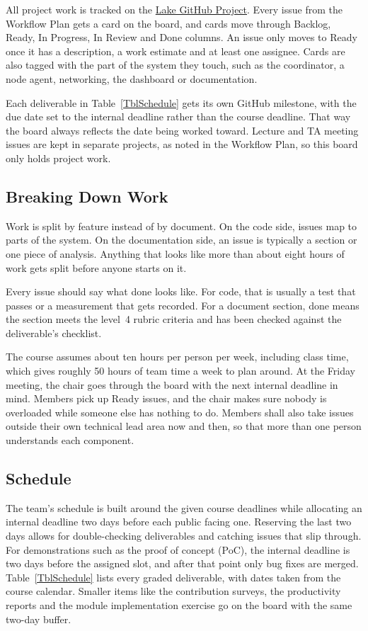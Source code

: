 \documentclass{article}
\begin{document}
All project work is tracked on the
\href{https://github.com/orgs/capstoneCEGJM/projects/1}{Lake GitHub Project}.
Every issue from the Workflow Plan gets a card on the board, and cards move
through Backlog, Ready, In Progress, In Review and Done columns. An issue only
moves to Ready once it has a description, a work estimate and at least
one assignee. Cards are also tagged with the part of the system they touch,
such as the coordinator, a node agent, networking, the dashboard or
documentation.

Each deliverable in Table~\ref{TblSchedule} gets its own GitHub milestone,
with the due date set to the internal deadline rather than the course
deadline. That way the board always reflects the date being worked
toward. Lecture and TA meeting issues are kept in separate projects, as noted
in the Workflow Plan, so this board only holds project work.

\subsection{Breaking Down Work}

Work is split by feature instead of by document. On the code side, issues map
to parts of the system. On the documentation side, an issue is typically a
section or one piece of analysis. Anything that looks like more than about
eight hours of work gets split before anyone starts on it. 

Every issue should say what done looks like. For code, that is usually a test
that passes or a measurement that gets recorded. For a document section, done
means the section meets the level~4 rubric criteria and has been checked
against the deliverable's checklist.

The course assumes about ten hours per person per week, including class time,
which gives roughly 50 hours of team time a week to plan around. At the Friday
meeting, the chair goes through the board with the next internal deadline in
mind. Members pick up Ready issues, and the chair makes sure nobody is
overloaded while someone else has nothing to do. Members shall also take
issues outside their own technical lead area now and then, so that more than
one person understands each component.

\subsection{Schedule}

The team's schedule is built around the given course deadlines while allocating an internal deadline two days before each public facing one. Reserving the last two days allows for double-checking deliverables and catching issues that slip through. For
demonstrations such as the proof of concept (PoC), the internal deadline is
two days before the assigned slot, and after that point only bug fixes are
merged. Table~\ref{TblSchedule} lists every graded deliverable, with dates
taken from the course calendar. Smaller items like the contribution surveys,
the productivity reports and the module implementation exercise go
on the board with the same two-day buffer.
\end{document}
